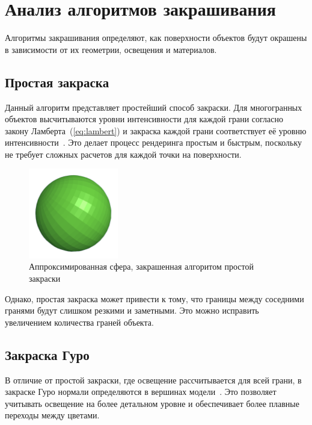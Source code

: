 \section{Анализ алгоритмов закрашивания}

Алгоритмы закрашивания определяют, как поверхности объектов будут окрашены в зависимости от их геометрии, освещения и материалов.

\subsection{Простая закраска}

Данный алгоритм представляет простейший способ закраски. Для многогранных объектов высчитываются уровни интенсивности для каждой грани согласно закону Ламберта~(\ref{eq:lambert}) и закраска каждой грани соответствует её уровню интенсивности~\cite{lit3}. Это делает процесс рендеринга простым и быстрым, поскольку не требует сложных расчетов для каждой точки на поверхности.

\begin{figure}[h] 
	\centering
	\includegraphics[width=0.35\textwidth]{images/simple-shading.png}
	\caption{Аппроксимированная сфера, закрашенная алгоритом простой закраски} 
	\label{fig:simple-shading} 
\end{figure}

Однако, простая закраска может привести к тому, что границы между соседними гранями будут слишком резкими и заметными. Это можно исправить увеличением количества граней объекта. 

\subsection{Закраска Гуро}

В отличие от простой закраски, где освещение рассчитывается для всей грани, в закраске Гуро нормали определяются в вершинах модели~\cite{lit3}. Это позволяет учитывать освещение на более детальном уровне и обеспечивает более плавные переходы между цветами.

